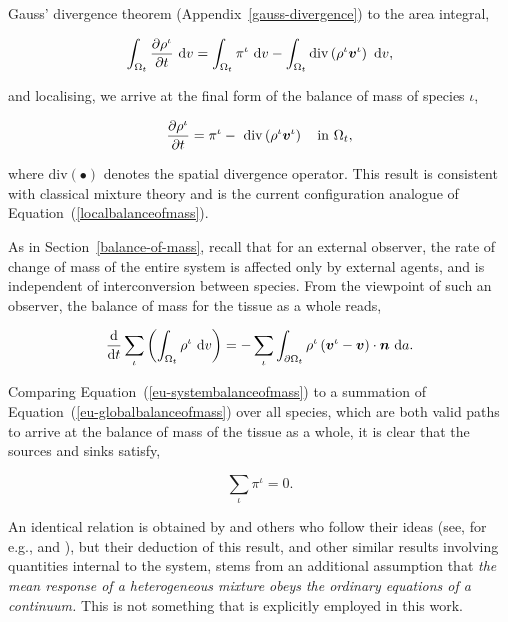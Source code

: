 \noindent Gauss' divergence theorem (Appendix~\ref{gauss-divergence})
to the area integral,

\begin{equation*}
\int_{\Omega_{t}} \frac{\partial \rho^{\iota}}{\partial t}
\ \mathrm{d}v = \int_{\Omega_{t}} \pi^{\iota} \ \mathrm{d}v -
\int_{\Omega_{t}} \mathrm{div} \left( \rho^{\iota} \mbox{\boldmath$ v$}^{\iota}\right)
\ \mathrm{d}v,
\end{equation*}

\noindent and localising, we arrive at the final form of the balance
of mass of species $\iota$,

\begin{equation}
\frac{\partial \rho^{\iota}}{\partial t} = \pi^{\iota} -\ \mathrm{div}
\left(\rho^{\iota} \mbox{\boldmath$ v$}^{\iota}\right) \quad \mathrm{in}\ \Omega_{t},
\label{eu-localbalanceofmass}
\end{equation}

\noindent where $\mathrm{div} (\bullet)$ denotes the spatial
divergence operator. This result is consistent with classical mixture
theory \citep{TruesdellToupin:60} and is the current configuration
analogue of Equation~(\ref{localbalanceofmass}).

As in Section~\ref{balance-of-mass}, recall that for an external
observer, the rate of change of mass of the entire system is affected
only by external agents, and is independent of interconversion between
species. From the viewpoint of such an observer, the balance of mass
for the tissue as a whole reads,

\begin{equation}
\frac{\mathrm{\mathrm{d}}}{\mathrm{\mathrm{d}}t} \sum\limits_{\iota}
\left(\int_{\Omega_{t}} \rho^{\iota} \ \mathrm{d}v \right) =
-\sum\limits_{\iota} \int_{\partial \Omega_{t}} \rho^{\iota}
\left(\mbox{\boldmath$ v$}^{\iota} - \mbox{\boldmath$ v$}\right) \cdot \mbox{\boldmath$ n$}\ \mathrm{d}a.
\label{eu-systembalanceofmass}
\end{equation}

\noindent Comparing Equation~(\ref{eu-systembalanceofmass}) to a
summation of Equation~(\ref{eu-globalbalanceofmass}) over all species,
which are both valid paths to arrive at the balance of mass of the
tissue as a whole, it is clear that the sources and sinks satisfy,

\begin{equation}
\sum\limits_{\iota}\pi^{\iota} = 0.
\label{eu-summationrelationmass}
\end{equation}

An identical relation is obtained by \citet{TruesdellToupin:60} and
others who follow their ideas (see, for e.g., \cite{passmanetal} and
\cite{ateshian07}), but their deduction of this result, and other
similar results involving quantities internal to the system, stems
from an additional assumption that {\em the mean response of a
  heterogeneous mixture obeys the ordinary equations of a continuum.}
This is not something that is explicitly employed in this work.

